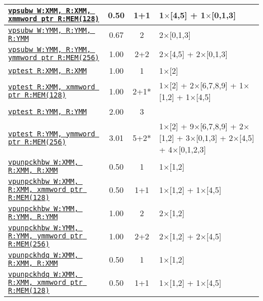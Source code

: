 \documentclass[a4paper,english,fontsize=9]{scrartcl}
\begin{document}
\begin{longtable}{p{}ccL{.25\textwidth}}
  \texttt{\href{https://felixcloutier.com/x86/PSUBB:PSUBW:PSUBD.html}{vpsubw W:XMM, R:XMM, xmmword ptr R:MEM(128)}} & 0.50 & 1+1 & 1\(\times\)[4,5] + 1\(\times\)[0,1,3] \\
  \midrule
  \texttt{\href{https://felixcloutier.com/x86/PSUBB:PSUBW:PSUBD.html}{vpsubw W:YMM, R:YMM, R:YMM}} & 0.67 & 2 & 2\(\times\)[0,1,3] \\
  \midrule
  \texttt{\href{https://felixcloutier.com/x86/PSUBB:PSUBW:PSUBD.html}{vpsubw W:YMM, R:YMM, ymmword ptr R:MEM(256)}} & 1.00 & 2+2 & 2\(\times\)[4,5] + 2\(\times\)[0,1,3] \\
  \midrule
  \texttt{\href{https://felixcloutier.com/x86/PTEST.html}{vptest R:XMM, R:XMM}} & 1.00 & 1 & 1\(\times\)[2] \\
  \midrule
  \texttt{\href{https://felixcloutier.com/x86/PTEST.html}{vptest R:XMM, xmmword ptr R:MEM(128)}} & 1.00 & 2+1* & 1\(\times\)[2] + 2\(\times\)[6,7,8,9] + 1\(\times\)[1,2] + 1\(\times\)[4,5] \\
  \midrule
  \texttt{\href{https://felixcloutier.com/x86/PTEST.html}{vptest R:YMM, R:YMM}} & 2.00 & 3 &  \\
  \midrule
  \texttt{\href{https://felixcloutier.com/x86/PTEST.html}{vptest R:YMM, ymmword ptr R:MEM(256)}} & 3.01 & 5+2* & 1\(\times\)[2] + 9\(\times\)[6,7,8,9] + 2\(\times\)[1,2] + 3\(\times\)[0,1,3] + 2\(\times\)[4,5] + 4\(\times\)[0,1,2,3] \\
  \midrule
  \texttt{\href{https://felixcloutier.com/x86/PUNPCKHBW:PUNPCKHWD:PUNPCKHDQ:PUNPCKHQDQ.html}{vpunpckhbw W:XMM, R:XMM, R:XMM}} & 0.50 & 1 & 1\(\times\)[1,2] \\
  \midrule
  \texttt{\href{https://felixcloutier.com/x86/PUNPCKHBW:PUNPCKHWD:PUNPCKHDQ:PUNPCKHQDQ.html}{vpunpckhbw W:XMM, R:XMM, xmmword ptr R:MEM(128)}} & 0.50 & 1+1 & 1\(\times\)[1,2] + 1\(\times\)[4,5] \\
  \midrule
  \texttt{\href{https://felixcloutier.com/x86/PUNPCKHBW:PUNPCKHWD:PUNPCKHDQ:PUNPCKHQDQ.html}{vpunpckhbw W:YMM, R:YMM, R:YMM}} & 1.00 & 2 & 2\(\times\)[1,2] \\
  \midrule
  \texttt{\href{https://felixcloutier.com/x86/PUNPCKHBW:PUNPCKHWD:PUNPCKHDQ:PUNPCKHQDQ.html}{vpunpckhbw W:YMM, R:YMM, ymmword ptr R:MEM(256)}} & 1.00 & 2+2 & 2\(\times\)[1,2] + 2\(\times\)[4,5] \\
  \midrule
  \texttt{\href{https://felixcloutier.com/x86/PUNPCKHBW:PUNPCKHWD:PUNPCKHDQ:PUNPCKHQDQ.html}{vpunpckhdq W:XMM, R:XMM, R:XMM}} & 0.50 & 1 & 1\(\times\)[1,2] \\
  \midrule
  \texttt{\href{https://felixcloutier.com/x86/PUNPCKHBW:PUNPCKHWD:PUNPCKHDQ:PUNPCKHQDQ.html}{vpunpckhdq W:XMM, R:XMM, xmmword ptr R:MEM(128)}} & 0.50 & 1+1 & 1\(\times\)[1,2] + 1\(\times\)[4,5] \\

\end{longtable}
\end{document}

